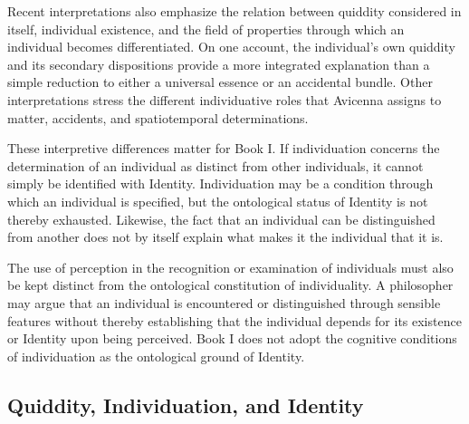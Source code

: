 Recent interpretations
also emphasize the
relation between
quiddity considered
in itself, individual
existence, and the
field of properties
through which an
individual becomes
differentiated. On
one account, the
individual's own
quiddity and its
secondary dispositions
provide a more
integrated explanation
than a simple
reduction to either
a universal essence
or an accidental
bundle. Other
interpretations stress
the different
individuative roles
that Avicenna assigns
to matter, accidents,
and spatiotemporal
determinations.
\citep{BilginTiryakiAvicennaIndividualization2025,PournamdarAvicennaIndividuation2025}

\label{para:VS.B01.P01.C08.S13.SS12.P004}

These interpretive
differences matter
for Book I. If
individuation concerns
the determination
of an individual
as distinct from
other individuals,
it cannot simply
be identified with
Identity. Individuation
may be a condition
through which an
individual is
specified, but
the ontological
status of Identity
is not thereby
exhausted. Likewise,
the fact that
an individual can
be distinguished
from another does
not by itself
explain what makes
it the individual
that it is.

\label{para:VS.B01.P01.C08.S13.SS12.P005}

The use of perception
in the recognition
or examination of
individuals must
also be kept
distinct from the
ontological constitution
of individuality.
A philosopher may
argue that an
individual is
encountered or
distinguished through
sensible features
without thereby
establishing that
the individual
depends for its
existence or
Identity upon
being perceived.
Book I does not
adopt the cognitive
conditions of
individuation as
the ontological
ground of Identity.



\subsection{Quiddity, Individuation, and Identity}
\label{subsec:ch08-avicenna-quiddity-individuation-identity}

\label{para:VS.B01.P01.C08.S13.SS13.P001}

